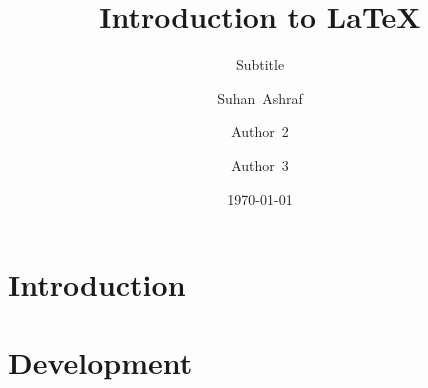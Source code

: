 \documentclass{beamer}
\begin{document}
    \begin{frame}
        \title{Introduction to \LaTeX{}}
        \author{Suhan~Ashraf \and 
        Author~2 \and
        Author~3}
        \date{\today}
        \subtitle{Subtitle}
        \maketitle
    \end{frame}
    \section{Introduction}
    \section{Development}
\end{document}
